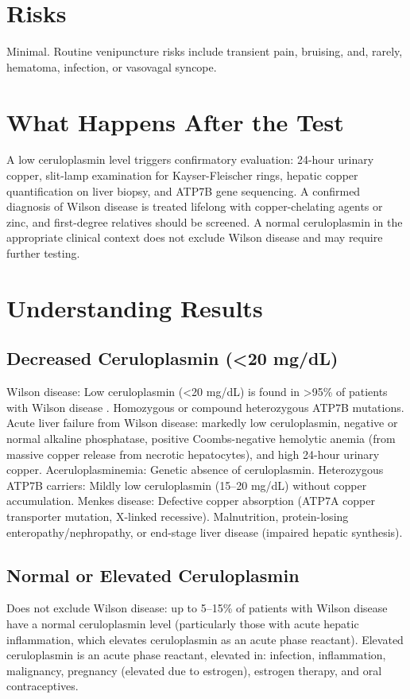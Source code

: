 \section*{Risks}
Minimal. Routine venipuncture risks include transient pain, bruising, and, rarely, hematoma, infection, or vasovagal syncope.
\section*{What Happens After the Test}
A low ceruloplasmin level triggers confirmatory evaluation: 24-hour urinary copper, slit-lamp examination for Kayser-Fleischer rings, hepatic copper quantification on liver biopsy, and ATP7B gene sequencing. A confirmed diagnosis of Wilson disease is treated lifelong with copper-chelating agents or zinc, and first-degree relatives should be screened. A normal ceruloplasmin in the appropriate clinical context does not exclude Wilson disease and may require further testing.
\section*{Understanding Results}
\subsection*{Decreased Ceruloplasmin (<20 mg/dL)}
Wilson disease: Low ceruloplasmin (<20 mg/dL) is found in >95\% of patients with Wilson disease \cite{ferenci2003diagnosis}. Homozygous or compound heterozygous ATP7B mutations. Acute liver failure from Wilson disease: markedly low ceruloplasmin, negative or normal alkaline phosphatase, positive Coombs-negative hemolytic anemia (from massive copper release from necrotic hepatocytes), and high 24-hour urinary copper. Aceruloplasminemia: Genetic absence of ceruloplasmin. Heterozygous ATP7B carriers: Mildly low ceruloplasmin (15--20 mg/dL) without copper accumulation. Menkes disease: Defective copper absorption (ATP7A copper transporter mutation, X-linked recessive). Malnutrition, protein-losing enteropathy/nephropathy, or end-stage liver disease (impaired hepatic synthesis).
\subsection*{Normal or Elevated Ceruloplasmin}
Does not exclude Wilson disease: up to 5--15\% of patients with Wilson disease have a normal ceruloplasmin level (particularly those with acute hepatic inflammation, which elevates ceruloplasmin as an acute phase reactant). Elevated ceruloplasmin is an acute phase reactant, elevated in: infection, inflammation, malignancy, pregnancy (elevated due to estrogen), estrogen therapy, and oral contraceptives.
